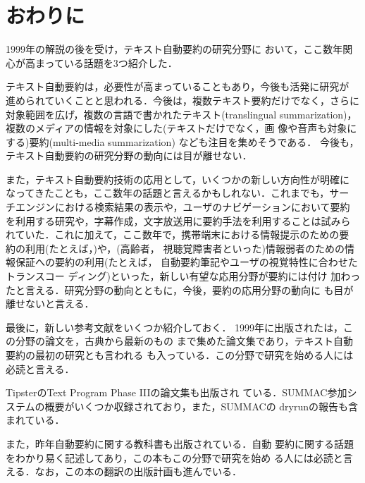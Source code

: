 \section{おわりに}

1999年の解説\cite{okumura:99:a}の後を受け，テキスト自動要約の研究分野に
おいて，ここ数年関心が高まっている話題を3つ紹介した．

テキスト自動要約は，必要性が高まっていることもあり，今後も活発に研究が
進められていくことと思われる．今後は，複数テキスト要約だけでなく，さらに
対象範囲を広げ，複数の言語で書かれたテキスト(translingual
summarization)，複数のメディアの情報を対象にした(テキストだけでなく，画
像や音声も対象にする)要約(multi-media summarization)
なども注目を集めそうである．
今後も，テキスト自動要約の研究分野の動向には目が離せない．


また，テキスト自動要約技術の応用として，いくつかの新しい方向性が明確に
なってきたことも，ここ数年の話題と言えるかもしれない．これまでも，サー
チエンジンにおける検索結果の表示や，ユーザのナビゲーションにおいて要約
を利用する研究や，字幕作成，文字放送用に要約手法を利用することは試みら
れていた．これに加えて，ここ数年で，携帯端末における情報提示のための要
約の利用(たとえば，\cite{buyukkokten:01:a,corston:01:a})や，(高齢者，
視聴覚障害者といった)情報弱者のための情報保証への要約の利用(たとえば，
自動要約筆記\cite{habata:01:a}やユーザの視覚特性に合わせたトランスコー
ディング\cite{maeda:01:a})といった，新しい有望な応用分野が要約には付け
加わったと言える．研究分野の動向とともに，今後，要約の応用分野の動向に
も目が離せないと言える．

最後に，新しい参考文献をいくつか紹介しておく．
1999年に出版された\cite{mani:99:a}は，この分野の論文を，古典から最新のもの
まで集めた論文集であり，テキスト自動要約の最初の研究とも言われる
\cite{luhn:58:a}も入っている．この分野で研究を始める人には必読と言える．

TipsterのText Program Phase IIIの論文集\cite{tipster:99:a}も出版され
ている．SUMMAC参加システムの概要がいくつか収録されており，また，SUMMACの
dryrunの報告も含まれている．

また，昨年自動要約に関する教科書も出版されている\cite{mani:01:a}．自動
要約に関する話題をわかり易く記述してあり，この本もこの分野で研究を始め
る人には必読と言える．なお，この本の翻訳の出版計画も進んでいる．






